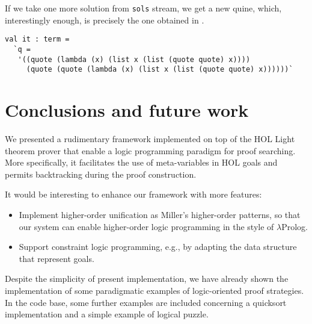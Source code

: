 If we take one more solution from \verb|sols| stream, we get a new
quine, which, interestingly enough, is precisely the one obtained in
\citep{Byrd:2012:MLU:2661103.2661105}.
\begin{verbatim}
val it : term =
  `q =
   '((quote (lambda (x) (list x (list (quote quote) x))))
     (quote (quote (lambda (x) (list x (list (quote quote) x))))))`
\end{verbatim}

\section{Conclusions and future work}
\label{sec:conclusions}

We presented a rudimentary framework implemented on top of the HOL
Light theorem prover that enable a logic programming paradigm for
proof searching.  More specifically, it facilitates the use of
meta-variables in HOL goals and permits backtracking during the proof
construction.

It would be interesting to enhance our framework with more features:
\begin{itemize}
\item Implement higher-order unification as Miller's higher-order
  patterns, so that our system can enable higher-order logic
  programming in the style of $\lambda$Prolog.
\item Support constraint logic programming, e.g., by adapting the data
  structure that represent goals.
\end{itemize}

Despite the simplicity of present implementation, we have already
shown the implementation of some paradigmatic examples of
logic-oriented proof strategies.  In the code base, some further
examples are included concerning a quicksort implementation and a
simple example of logical puzzle.

